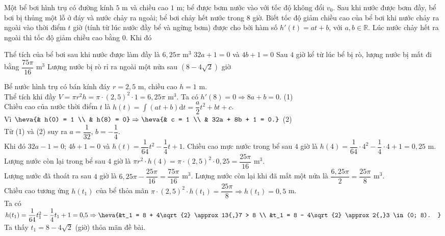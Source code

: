 \documentclass[12pt,aspectratio=169]{beamer}
\begin{document}
\begin{dungsai}[n]%
	Một bể bơi hình trụ có đường kính $5$ m và chiều cao $1$ m; bể được bơm nước vào với tốc độ không đổi $v_0$. Sau khi nước được bơm đầy, bể bơi bị thủng một lỗ ở đáy và nước chảy ra ngoài; bể bơi chảy hết nước trong $8$ giờ. Biết tốc độ giảm chiều cao của bể bơi khi nước chảy ra ngoài vào thời điểm $t$ giờ (tính từ lúc nước đầy bể và ngừng bơm) được cho bởi hàm số $h'(t)=at+b$, với $a,b\in \mathbb{R}$. Lúc nước chảy hết ra ngoài thì tốc độ giảm chiều cao bằng $0$. Khi đó

	\choiceTF
		{Thể tích của bể bơi sau khi nước được làm đầy là $6{,}25\pi$ m$^3$}
		{$32a+1=0$ và $4b+1=0$}
		{Sau $4$ giờ kể từ lúc bể bị rò, lượng nước bị mất đi bằng $\dfrac{75\pi }{16}$ m$^3$}
		{Lượng nước bị rò rỉ ra ngoài một nửa sau $\left(8-4\sqrt{2}\right)$ giờ}

	\begin{loigiai}
			\begin{itemchoice}
				\itemch Bể nước hình trụ có bán kính đáy $r = 2{,}5$ m, chiều cao $h = 1$ m.\\
				Thể tích khi đầy $V = \pi r^2 h = \pi \cdot (2{,}5)^2 \cdot 1 = 6{,}25\pi$ m$^3$.
				\itemch Ta có $h'(8) = 0 \Rightarrow 8a + b = 0$. \quad (1)\\
				Chiều cao của nước thời điểm $t$ là $h(t) = \displaystyle\int (at+b)\mathrm{d}t = \dfrac{a}{2}t^2 + bt + c$.\\
				Vì $\heva{& h(0) = 1 \\ & h(8) = 0} \Rightarrow \heva{& c = 1 \\ & 32a + 8b + 1 = 0.}$ \quad (2)\\
				Từ (1) và (2) suy ra $a = \dfrac{1}{32}$, $b = -\dfrac{1}{4}$.\\ Khi đó $32a - 1 = 0$; $4b + 1 = 0$ và $h(t) = \dfrac{1}{64}t^2 - \dfrac{1}{4}t + 1$.
				\itemch Chiều cao mực nước trong bể sau $4$ giờ là $h(4) = \dfrac{1}{64} \cdot 4^2 - \dfrac{1}{4} \cdot 4 + 1 = 0{,}25$ m.\\
				Lượng nước còn lại trong bể sau $4$ giờ là $\pi r^2 \cdot h(4) = \pi \cdot (2{,}5)^2 \cdot 0{,}25 = \dfrac{25\pi}{16}$ m$^3$.\\
				Lượng nước đã thoát ra sau $4$ giờ là $6{,}25\pi - \dfrac{25\pi}{16} = \dfrac{75\pi}{16}$ m$^3$.
				\itemch Lượng nước còn lại khi đã mất một nửa là $\dfrac{6{,}25\pi}{2} = \dfrac{25\pi}{8}$ m$^3$.\\
				Chiều cao tương ứng $h(t_1)$ của bể thỏa mãn $\pi \cdot (2{,}5)^2 \cdot h(t_1) = \dfrac{25\pi}{8} \Rightarrow h(t_1) = 0{,}5$ m.\\
				Ta có $h(t_1) = \dfrac{1}{64}t_1^2 - \dfrac{1}{4}t_1 + 1 = 0{,}5 \Rightarrow \heva{&t_1 = 8 + 4\sqrt{2} \approx 13{,}7 > 8 \\ &t_1 = 8 - 4\sqrt{2} \approx 2{,}3 \in (0; 8).
				}$\\
				Ta thấy $t_1 = 8 - 4\sqrt{2}$ (giờ) thỏa mãn đề bài.
		\end{itemchoice}
	\end{loigiai}
\end{dungsai}
\end{document}
